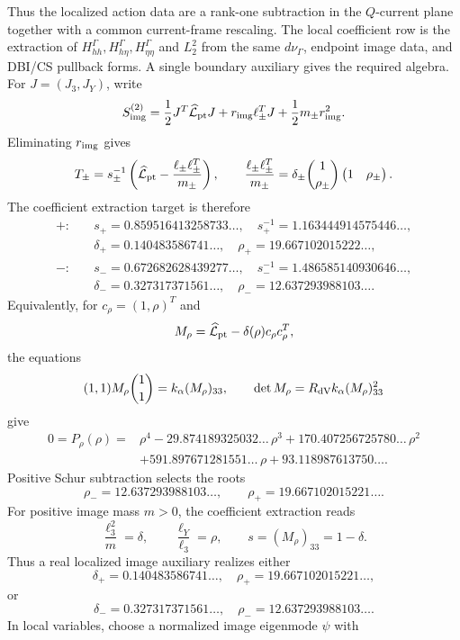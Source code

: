 \documentclass[11pt]{article}
\theoremstyle{definition}
\theoremstyle{remark}
\begin{document}
Thus the localized action data are a rank-one subtraction in the
\(Q\)-current plane together with a common current-frame rescaling.  The local
coefficient row is the extraction of
\(H_{hh}^\Gamma,H_{h\eta}^\Gamma,H_{\eta\eta}^\Gamma\) and \(L_2^2\) from the
same \(d\nu_\Gamma\), endpoint image data, and DBI/CS pullback forms.
A single boundary auxiliary gives the required algebra.  For \(J=(J_3,J_Y)\),
write
\[
  S_{\rm img}^{(2)}
  =
  \frac12J^T\widehat{\cal L}_{\rm pt}J
  +r_{\rm img}\ell_\pm^TJ
  +\frac12m_\pm r_{\rm img}^2 .
\]
Eliminating \(r_{\rm img}\) gives
\[
  T_\pm
  =
  s_\pm^{-1}
  \left(
  \widehat{\cal L}_{\rm pt}
  -\frac{\ell_\pm\ell_\pm^T}{m_\pm}
  \right),
  \qquad
  \frac{\ell_\pm\ell_\pm^T}{m_\pm}
  =
  \delta_\pm
  \binom{1}{\rho_\pm}
  \begin{pmatrix}1&\rho_\pm\end{pmatrix}.
\]
The coefficient extraction target is therefore
\[
\begin{aligned}
+:\quad&
s_+=0.859516413258733\ldots,
\quad
s_+^{-1}=1.163444914575446\ldots,\\
&
\delta_+=0.140483586741\ldots,
\quad
\rho_+=19.667102015222\ldots,\\
-:\quad&
s_-=0.672682628439277\ldots,
\quad
s_-^{-1}=1.486585140930646\ldots,\\
&
\delta_-=0.327317371561\ldots,
\quad
\rho_-=12.637293988103\ldots .
\end{aligned}
\]
Equivalently, for \(c_\rho=(1,\rho)^T\) and
\[
  M_\rho=\widehat{\cal L}_{\rm pt}-\delta(\rho)c_\rho c_\rho^T ,
\]
the equations
\[
  (1,1)M_\rho\binom11=k_\alpha(M_\rho)_{33},
  \qquad
  \det M_\rho=R_{\rm dV}k_\alpha(M_\rho)_{33}^2
\]
give
\[
\begin{aligned}
0=P_\rho(\rho)
={}&
\rho^4
-29.874189325032\ldots\,\rho^3
+170.407256725780\ldots\,\rho^2\\
&+591.897671281551\ldots\,\rho
+93.118987613750\ldots .
\end{aligned}
\]
Positive Schur subtraction selects the roots
\[
  \rho_-=12.637293988103\ldots,
  \qquad
  \rho_+=19.667102015221\ldots .
\]
For positive image mass \(m>0\), the coefficient extraction reads
\[
  \frac{\ell_3^2}{m}=\delta,\qquad
  \frac{\ell_Y}{\ell_3}=\rho,\qquad
  s=(M_\rho)_{33}=1-\delta .
\]
Thus a real localized image auxiliary realizes either
\[
  \delta_+=0.140483586741\ldots,\quad
  \rho_+=19.667102015221\ldots,
\]
or
\[
  \delta_-=0.327317371561\ldots,\quad
  \rho_-=12.637293988103\ldots .
\]
In local variables, choose a normalized image eigenmode \(\psi\) with
\end{document}
